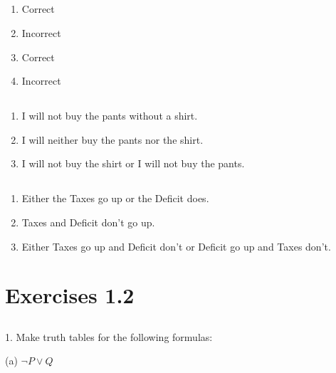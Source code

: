 \documentclass{article}
\begin{document}
\subsection{}
\begin{enumerate}[label=(\alph*)]
  \item Correct
  \item Incorrect %
  \item Correct
  \item Incorrect %
\end{enumerate}
\subsection{}
\begin{enumerate}[label=(\alph*)]
  \item I will not buy the pants without a shirt.
  \item I will neither buy the pants nor the shirt.
  \item I will not buy the shirt or I will not buy the pants.
\end{enumerate}
\subsection{}
\begin{enumerate}[label=(\alph*)]
  \item Either the Taxes go up or the Deficit does.
  \item Taxes and Deficit don't go up.
  \item Either Taxes go up and Deficit don't or Deficit go up and Taxes don't.
\end{enumerate}
\section{Exercises 1.2}
\subsection{}
1. Make truth tables for the following formulas:

(a) $\neg P \lor Q$
\end{document}
